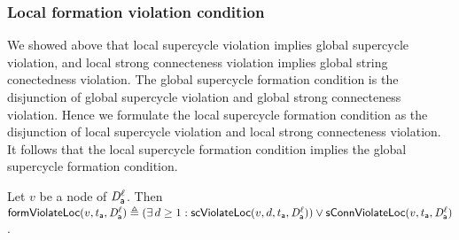 



\subsubsection{Local formation violation condition}


We showed above that local supercycle violation implies global supercycle violation, and local strong connecteness violation implies global string conectedness
violation.
The global supercycle formation condition is the disjunction of global supercycle violation and global strong connecteness violation.
Hence we formulate the local supercycle formation condition as the disjunction of local supercycle violation and local strong connecteness violation.
It follows that the local supercycle formation condition implies the global supercycle formation condition.



\label{def:locFormation.violation}
Let $v$ be a node of $\mathit{D}_{\mathsf{a}}^{\ell}$.
Then $\mathsf{formViolateLoc}(v,t_{\mathsf{a}},\mathit{D}_{\mathsf{a}}^{\ell})  \triangleq  (\exists\, d \ge 1: \mathsf{scViolateLoc}(v,d,t_{\mathsf{a}},\mathit{D}_{\mathsf{a}}^{\ell})) \lor \mathsf{sConnViolateLoc}(v,t_{\mathsf{a}},\mathit{D}_{\mathsf{a}}^{\ell})$.
\ed
%


